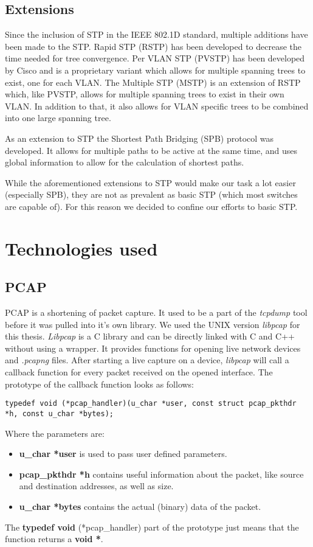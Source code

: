 \subsection*{Extensions}
Since the inclusion of STP in the IEEE 802.1D\cite{802.1D} standard, multiple additions have been made to the STP.
Rapid STP (RSTP) has been developed to decrease the time needed for tree convergence.
Per VLAN STP (PVSTP) has been developed by Cisco and is a proprietary variant which allows for multiple spanning trees to exist, one for each VLAN.
The Multiple STP (MSTP) is an extension of RSTP which, like PVSTP, allows for multiple spanning trees to exist in their own VLAN.
In addition to that, it also allows for VLAN specific trees to be combined into one large spanning tree.

As an extension to STP the Shortest Path Bridging (SPB)\cite{spb} protocol was developed.
It allows for multiple paths to be active at the same time, and uses global information to allow for the calculation of shortest paths.

While the aforementioned extensions to STP would make our task a lot easier (especially SPB), they are not as prevalent as basic STP (which most switches are capable of).
For this reason we decided to confine our efforts to basic STP.

\section{Technologies used}
\subsection*{PCAP}
\label{pcap}
PCAP\cite{pcap} is a shortening of packet capture.
It used to be a part of the \textit{tcpdump} tool before it was pulled into it's own library.
We used the UNIX version \textit{libpcap} for this thesis.
\textit{Libpcap} is a C library and can be directly linked with C and C++ without using a wrapper.
It provides functions for opening live network devices and \textit{.pcapng} files.
After starting a live capture on a device, \textit{libpcap} will call a callback function for every packet received on the opened interface.
The prototype of the callback function looks as follows:
\begin{lstlisting}[caption=Pcap Callback Prototype]
typedef void (*pcap_handler)(u_char *user, const struct pcap_pkthdr *h, const u_char *bytes);
\end{lstlisting}
Where the parameters are:
\begin{itemize}
    \item \textbf{u\_char *user} is used to pass user defined parameters.
    \item \textbf{pcap\_pkthdr *h} contains useful information about the packet, like source and destination addresses, as well as size.
    \item \textbf{u\_char *bytes} contains the actual (binary) data of the packet.
\end{itemize}
The \textbf{typedef void} (*pcap\_handler) part of the prototype just means that the function returns a \textbf{void *}.

